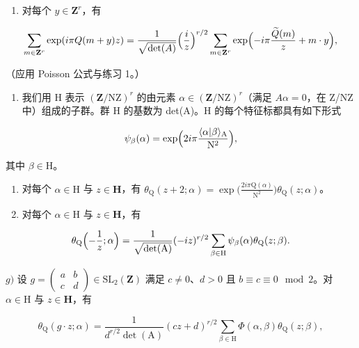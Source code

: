 \begin{enumerate}
\def\labelenumi{\alph{enumi})}
\setcounter{enumi}{2}
\tightlist
\item
  对每个 \(y \in \mathbf{Z}^r\)，有
\end{enumerate}

\[
\sum_ {m \in {\bf Z} ^ {r}} \exp (i \pi Q (m + y) z) = \frac {1}{\sqrt {\det (A)}} \Bigl (\frac {i}{z} \Bigr) ^ {r / 2} \sum_ {m \in {\bf Z} ^ {r}} \exp \Bigl (- i \pi \frac {\widetilde {Q} (m)}{z} + m \cdot y \Bigr),
\]

（应用 Poisson 公式与练习 1。）

\begin{enumerate}
\def\labelenumi{\alph{enumi})}
\setcounter{enumi}{3}
\tightlist
\item
  我们用 H 表示 \((\mathbf{Z}/\mathrm{NZ})^{r}\) 的由元素 \(\alpha\in(\mathbf{Z}/\mathrm{NZ})^{r}\)（满足 \(A\alpha=0\)，在 Z/NZ 中）组成的子群。群 H 的基数为 det(A)。H 的每个特征标都具有如下形式
\end{enumerate}

\[
\psi_ {\beta} (\alpha) = \exp \Bigl (2 i \pi \frac {\langle \alpha | \beta \rangle_ {\mathrm{A}}}{\mathrm{N} ^ {2}} \Bigr),
\]

其中 \(\beta\in\mathrm{H}\)。

\begin{enumerate}
\def\labelenumi{\alph{enumi})}
\setcounter{enumi}{4}
\item
  对每个 \(\alpha \in \mathrm{H}\) 与 \(z\in \mathbf{H}\)，有 \(\theta_{\mathrm{Q}}(z + 2;\alpha) = \exp \bigl (\frac{2i\pi\mathrm{Q}(\alpha)}{\mathrm{N}^2}\bigr)\theta_{\mathrm{Q}}(z;\alpha)\)。
\item
  对每个 \(\alpha \in \mathrm{H}\) 与 \(z\in \mathbf{H}\)，有
\end{enumerate}

\[
\theta_ {\mathrm{Q}} \Bigl (- \frac {1}{z}; \alpha \Bigr) = \frac {1}{\sqrt {\det (\mathrm{A})}} (- i z) ^ {r / 2} \sum_ {\beta \in \mathrm{H}} \psi_ {\beta} (\alpha) \theta_ {\mathrm{Q}} (z; \beta).
\]

\(g)\) 设 \(g = \begin{pmatrix} a & b \\ c & d \end{pmatrix} \in \mathrm{SL}_2(\mathbf{Z})\) 满足 \(c \neq 0\)、\(d > 0\) 且 \(b \equiv c \equiv 0 \mod 2\)。对 \(\alpha \in \mathrm{H}\) 与 \(z \in \mathbf{H}\)，有

\[
\theta_ {\mathrm{Q}} (g \cdot z; \alpha) = \frac {1}{d ^ {r / 2} \det (\mathrm{A})} (c z + d) ^ {r / 2} \sum_ {\beta \in \mathrm{H}} \Phi (\alpha , \beta) \theta_ {\mathrm{Q}} (z; \beta),
\]

